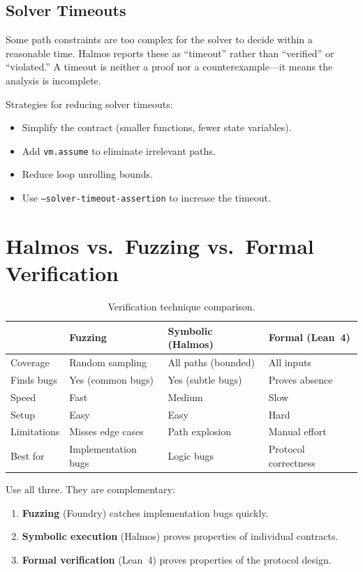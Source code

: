 \documentclass[11pt,a4paper]{article}
\begin{document}
\subsection{Solver Timeouts}

Some path constraints are too complex for the solver to decide within a reasonable time.
Halmos reports these as ``timeout'' rather than ``verified'' or ``violated.'' A timeout
is neither a proof nor a counterexample---it means the analysis is incomplete.

Strategies for reducing solver timeouts:
\begin{itemize}[nosep]
  \item Simplify the contract (smaller functions, fewer state variables).
  \item Add \texttt{vm.assume} to eliminate irrelevant paths.
  \item Reduce loop unrolling bounds.
  \item Use \texttt{--solver-timeout-assertion} to increase the timeout.
\end{itemize}

\section{Halmos vs.\ Fuzzing vs.\ Formal Verification}

\begin{table}[H]
\centering
\small
\begin{tabular}{@{}llll@{}}
\toprule
 & \textbf{Fuzzing} & \textbf{Symbolic (Halmos)} & \textbf{Formal (Lean~4)} \\
\midrule
Coverage & Random sampling & All paths (bounded) & All inputs \\
Finds bugs & Yes (common bugs) & Yes (subtle bugs) & Proves absence \\
Speed & Fast & Medium & Slow \\
Setup & Easy & Easy & Hard \\
Limitations & Misses edge cases & Path explosion & Manual effort \\
Best for & Implementation bugs & Logic bugs & Protocol correctness \\
\bottomrule
\end{tabular}
\caption{Verification technique comparison.}
\end{table}

Use all three. They are complementary:
\begin{enumerate}[nosep]
  \item \textbf{Fuzzing} (Foundry) catches implementation bugs quickly.
  \item \textbf{Symbolic execution} (Halmos) proves properties of individual contracts.
  \item \textbf{Formal verification} (Lean~4) proves properties of the protocol design.
\end{enumerate}
\end{document}
